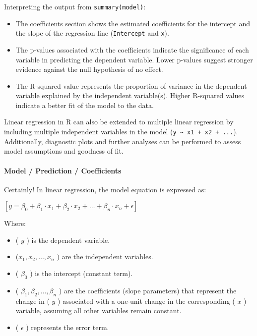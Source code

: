 \documentclass[
]{article}
\begin{document}
Interpreting the output from \texttt{summary(model)}:

\begin{itemize}
\item
  The coefficients section shows the estimated coefficients for the
  intercept and the slope of the regression line (\texttt{Intercept} and
  \texttt{x}).
\item
  The p-values associated with the coefficients indicate the
  significance of each variable in predicting the dependent variable.
  Lower p-values suggest stronger evidence against the null hypothesis
  of no effect.
\item
  The R-squared value represents the proportion of variance in the
  dependent variable explained by the independent variable(s). Higher
  R-squared values indicate a better fit of the model to the data.
\end{itemize}

Linear regression in R can also be extended to multiple linear
regression by including multiple independent variables in the model
(\texttt{y\ \textasciitilde{}\ x1\ +\ x2\ +\ ...}). Additionally,
diagnostic plots and further analyses can be performed to assess model
assumptions and goodness of fit.

\hypertarget{model--prediction--coefficients}{%
\paragraph{Model / Prediction /
Coefficients}\label{model--prediction--coefficients}}

Certainly! In linear regression, the model equation is expressed as:

\([ y = \beta_0 + \beta_1 \cdot x_1 + \beta_2 \cdot x_2 + \ldots + \beta_n \cdot x_n + \epsilon ]\)

Where:

\begin{itemize}
\item
  ( \(y\) ) is the dependent variable.
\item
  (\( x_1, x_2, \ldots, x_n\) ) are the independent variables.
\item
  ( \(\beta_0\) ) is the intercept (constant term).
\item
  ( \(\beta_1, \beta_2, \ldots, \beta_n\) ) are the coefficients (slope
  parameters) that represent the change in ( \(y\) ) associated with a
  one-unit change in the corresponding ( \(x\) ) variable, assuming all
  other variables remain constant.
\item
  ( \(\epsilon\) ) represents the error term.
\end{itemize}
\end{document}

